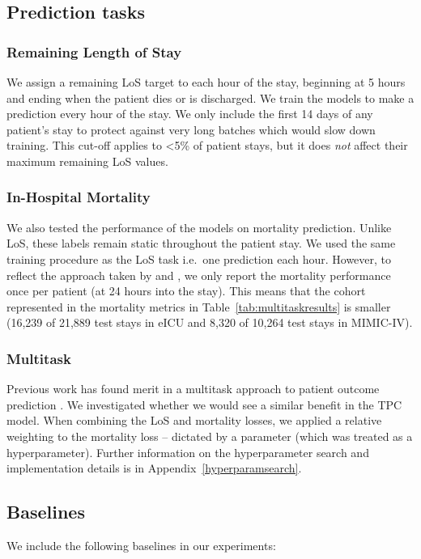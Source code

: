 \documentclass[sigconf]{acmart}
\begin{document}
\subsection{Prediction tasks}
\subsubsection{Remaining Length of Stay}
We assign a remaining LoS target to each hour of the stay, beginning at 5 hours and ending when the patient dies or is discharged. We train the models to make a prediction every hour of the stay. We only include the first 14 days of any patient's stay to protect against very long batches which would slow down training. This cut-off applies to <5\% of patient stays, but it does \textit{not} affect their maximum remaining LoS values.

\subsubsection{In-Hospital Mortality}
We also tested the performance of the models on mortality prediction. Unlike LoS, these labels remain static throughout the patient stay. We used the same training procedure as the LoS task i.e.\ one prediction each hour. However, to reflect the approach taken by \citet{purushotham2017benchmark} and \citet{harutyunyan}, we only report the mortality performance once per patient (at 24 hours into the stay). This means that the cohort represented in the mortality metrics in Table~\ref{tab:multitaskresults} is smaller (16,239 of 21,889 test stays in eICU and 8,320 of 10,264 test stays in MIMIC-IV).

\subsubsection{Multitask}
Previous work has found merit in a multitask approach to patient outcome prediction \citep{harutyunyan, sheikhalishahi2019benchmarking}. We investigated whether we would see a similar benefit in the TPC model. When combining the LoS and mortality losses, we applied a relative weighting to the mortality loss -- dictated by a parameter  (which was treated as a hyperparameter). Further information on the hyperparameter search and implementation details is in Appendix~\ref{hyperparamsearch}.

\subsection{Baselines}
\label{baselines}
We include the following baselines in our experiments:
\end{document}
